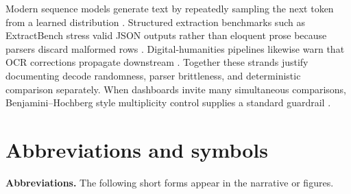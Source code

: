 \documentclass[11pt,a4paper]{article}
\theoremstyle{remark}
\begin{document}
Modern sequence models generate text by repeatedly sampling the next token from a learned distribution \citep{vaswani2017attention}. Structured extraction benchmarks such as ExtractBench stress valid JSON outputs rather than eloquent prose because parsers discard malformed rows \citep{extractbench2026}. Digital-humanities pipelines likewise warn that OCR corrections propagate downstream \citep{norton2026ocrprovenance}. Together these strands justify documenting decode randomness, parser brittleness, and deterministic comparison separately. When dashboards invite many simultaneous comparisons, Benjamini--Hochberg style multiplicity control supplies a standard guardrail \citep{benjamini1995controlling}.

\tableofcontents
\newpage

\section*{Abbreviations and symbols}
\label{sec:abbrev}

\noindent\textbf{Abbreviations.}\quad
The following short forms appear in the narrative or figures.
\end{document}
